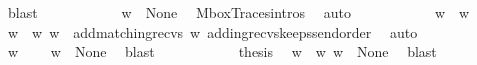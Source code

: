 \begin{isabellebody}
\ blast\isanewline
\ \ \ \ \ \ \ \ \isamarkupfalse%
\ \isamarkupfalse%
\ {\isachardoublequoteopen}w{\isacharprime}{\kern0pt}\ {\isasymin}\ {\isasymT}\isactrlbsub None\isactrlesub {\isachardoublequoteclose}\ \isamarkupfalse%
\ MboxTraces{\isachardot}{\kern0pt}intros\ \isamarkupfalse%
\ auto\isanewline
\ \ \ \ \ \ \ \ \isamarkupfalse%
\ \isamarkupfalse%
\ {\isachardoublequoteopen}w\ {\isacharequal}{\kern0pt}\ w{\isacharprime}{\kern0pt}{\isasymdown}\isactrlsub {\isacharbang}{\kern0pt}{\isachardoublequoteclose}\ \isamarkupfalse%
\ {\isacartoucheopen}w\ {\isacharequal}{\kern0pt}\ w{\isasymdown}\isactrlsub {\isacharbang}{\kern0pt}{\isacartoucheclose}\ {\isacartoucheopen}w{\isacharprime}{\kern0pt}\ {\isacharequal}{\kern0pt}\ add{\isacharunderscore}{\kern0pt}matching{\isacharunderscore}{\kern0pt}recvs\ w{\isacartoucheclose}\ adding{\isacharunderscore}{\kern0pt}recvs{\isacharunderscore}{\kern0pt}keeps{\isacharunderscore}{\kern0pt}send{\isacharunderscore}{\kern0pt}order\ \isamarkupfalse%
\ auto\isanewline
\ \ \ \ \ \ \ \ \isamarkupfalse%
\ \isamarkupfalse%
\ {\isachardoublequoteopen}{\isacharparenleft}{\kern0pt}w{\isacharprime}{\kern0pt}{\isasymdown}\isactrlsub {\isacharbang}{\kern0pt}{\isacharparenright}{\kern0pt}\ {\isasymin}\ {\isasymL}\isactrlsub {\isasyminfinity}{\isachardoublequoteclose}\ \isamarkupfalse%
\ {\isacartoucheopen}w{\isacharprime}{\kern0pt}\ {\isasymin}\ {\isasymT}\isactrlbsub None\isactrlesub {\isacartoucheclose}\ \isamarkupfalse%
\ blast\isanewline
\ \ \ \ \ \ \ \ \isamarkupfalse%
\ \isamarkupfalse%
\ {\isacharquery}{\kern0pt}thesis\ \isamarkupfalse%
\ {\isacartoucheopen}w\ {\isacharequal}{\kern0pt}\ w{\isacharprime}{\kern0pt}{\isasymdown}\isactrlsub {\isacharbang}{\kern0pt}{\isacartoucheclose}\ {\isacartoucheopen}w{\isacharprime}{\kern0pt}\ {\isasymin}\ {\isasymT}\isactrlbsub None\isactrlesub {\isacartoucheclose}\ \isamarkupfalse%
\ blast\isanewline
\ \ \ \ \ \ \isamarkupfalse%
\ \ \ \ \ \ \isanewline
\ \ \ \ \isamarkupfalse%
\isanewline
\ \ \isamarkupfalse%
\isanewline
{}\isamarkupfalse%
%
\endisatagproof
{\isafoldproof}%
%
\isadelimproof
\isanewline
%
\endisadelimproof
\isanewline
\isanewline
\isanewline
\isanewline
\isanewline
\isanewline
{}\isamarkupfalse%
\isanewline
%
\isadelimtheory
%
\endisadelimtheory
%
\isatagtheory
{}\isamarkupfalse%
%
\endisatagtheory
{\isafoldtheory}%
%
\isadelimtheory
%
\endisadelimtheory
%
\end{isabellebody}%
